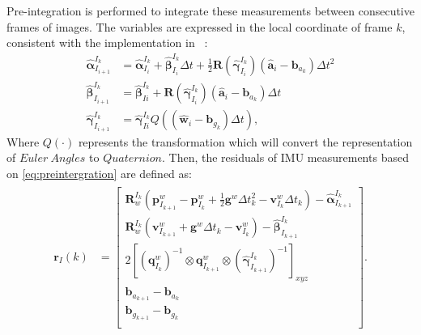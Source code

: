    Pre-integration is performed to integrate these measurements between consecutive frames of images. The variables are expressed in the local coordinate of frame $k$, consistent with the implementation in  ~\cite{forster2017manifold-preintergration,qin-tro-2018_VINS-Mono}: 
    \begin{equation}
      \label{eq:preintergration}
      \begin{aligned}
        \bm{\hat{\alpha}}^{I_k}_{I_{i+1}} &= {\bm{\hat{\alpha}}^{I_k}_{I_i}} + {\bm{\hat{\beta}}^{I_k}_{I_i}}\Delta t 
        + \frac{1}{2}\textbf{R}({\bm{\hat{\gamma}}^{I_k}_{I_i}})(\hat{\textbf{a}}_i - \textbf{b}_{a_k})\Delta t^2\\
        \bm{\hat{\beta}}^{I_k}_{I_{i+1}} &= {\bm{\hat{\beta}}^{I_k}_{Ii}} 
        + \textbf{R}({\bm{\hat{\gamma}}^{I_k}_{I_i}})(\hat{\textbf{a}}_i - \textbf{b}_{a_k})\Delta t \\
        \bm{\hat{\gamma}}^{I_k}_{I_{i+1}} &= {\bm{\hat{\gamma}}^{I_k}_{Ii}}Q((\hat{\textbf{w}}_i
        - \textbf{b}_{g_k})\Delta t),
      \end{aligned}
    \end{equation}
    Where $Q(\cdot)$ represents the transformation which will convert the representation of $Euler\ Angles$ to $Quaternion$. Then, the residuals of IMU measurements based on \cref{eq:preintergration} are defined as:
    \begin{equation}
    \label{IMU_residual}
      \begin{split}
      \begin{aligned}
      {\textbf{r}_I}(k) &= 
       \left[
        \begin{matrix}
          \textbf{R}^{I_k}_w({\textbf{p}_{I_{k+1}}^w} - {\textbf{p}^w_{I_k}} + \frac{1}{2}\textbf{g}^w\Delta t^2_k 
            -{\textbf{v}^w_{I_k}}\Delta t_k) -\hat{\bm{\alpha}}^{I_k}_{I_{k+1}} \\
          \textbf{R}^{I_k}_w({\textbf{v}_{I_{k+1}}^w} + \textbf{g}^w\Delta t_k - \textbf{v}^w_{I_k}) - \hat{\bm{\beta}}^{I_k}_{I_{k+1}} \\
          2[{(\textbf{q}^w_{I_k})}^{-1} \otimes \textbf{q}^w_{I_{k+1}} \otimes {(\hat{\bm{\gamma}}^{I_k}_{I_{k+1}})}^{-1}]_{xyz} \\
          \textbf{b}_{a_{k+1}} - \textbf{b}_{a_k} \\
          \textbf{b}_{g_{k+1}} - \textbf{b}_{g_k} \\
        \end{matrix}
       \right]. \\
      \end{aligned}
      \end{split}
    \end{equation}
